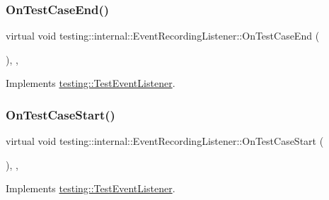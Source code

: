 \subsubsection{\texorpdfstring{OnTestCaseEnd()}{OnTestCaseEnd()}}
{\footnotesize\ttfamily virtual void testing\+::internal\+::\+Event\+Recording\+Listener\+::\+On\+Test\+Case\+End (\begin{DoxyParamCaption}\item[{const \mbox{\hyperlink{classtesting_1_1TestCase}{Test\+Case}} \&}]{ }\end{DoxyParamCaption})\hspace{0.3cm}{\ttfamily [inline]}, {\ttfamily [protected]}, {\ttfamily [virtual]}}



Implements \mbox{\hyperlink{classtesting_1_1TestEventListener_ae61985e2ef76ac78379b077be57a9c36}{testing\+::\+Test\+Event\+Listener}}.

\mbox{\label{classtesting_1_1internal_1_1EventRecordingListener_a18c28e1d1c3a1e74e225966456786f8e}} 
\subsubsection{\texorpdfstring{OnTestCaseStart()}{OnTestCaseStart()}}
{\footnotesize\ttfamily virtual void testing\+::internal\+::\+Event\+Recording\+Listener\+::\+On\+Test\+Case\+Start (\begin{DoxyParamCaption}\item[{const \mbox{\hyperlink{classtesting_1_1TestCase}{Test\+Case}} \&}]{ }\end{DoxyParamCaption})\hspace{0.3cm}{\ttfamily [inline]}, {\ttfamily [protected]}, {\ttfamily [virtual]}}



Implements \mbox{\hyperlink{classtesting_1_1TestEventListener_ab4ed885d63f5bbff8076c1329b3dfe36}{testing\+::\+Test\+Event\+Listener}}.

\mbox{\label{classtesting_1_1internal_1_1EventRecordingListener_adb076f145cc20d9b27441b9c75da4b81}} 
